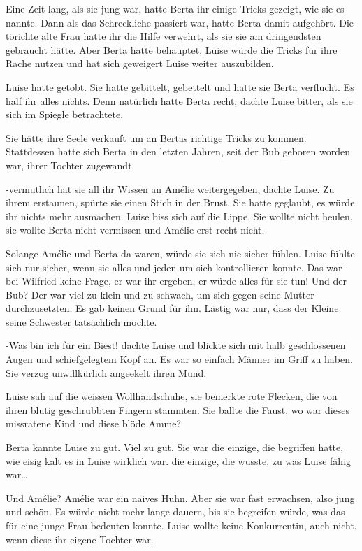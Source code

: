 \documentclass[11pt,titlepage,a5paper]{book}
\begin{document}
Eine Zeit lang, als sie jung war, hatte Berta ihr einige Tricks gezeigt, wie sie es nannte. Dann als das Schreckliche passiert war, hatte Berta damit aufgehört. Die törichte alte Frau hatte ihr die Hilfe verwehrt, als sie sie am dringendsten gebraucht hätte. Aber Berta hatte behauptet, Luise würde die Tricks für ihre Rache nutzen und hat sich geweigert Luise weiter auszubilden.

Luise hatte getobt. Sie hatte gebittelt, gebettelt und hatte sie Berta verflucht. Es half ihr alles nichts. Denn natürlich hatte Berta recht, dachte Luise bitter, als sie sich im Spiegle betrachtete.

Sie hätte ihre Seele verkauft um an Bertas richtige Tricks zu kommen. Stattdessen hatte sich Berta in den letzten Jahren, seit der Bub geboren worden war, ihrer Tochter zugewandt. 

-vermutlich hat sie all ihr Wissen an Amélie weitergegeben, dachte Luise. Zu ihrem erstaunen, spürte sie einen Stich in der Brust. Sie hatte geglaubt, es würde ihr nichts mehr ausmachen. Luise biss sich auf die Lippe. Sie wollte nicht heulen, sie wollte Berta nicht vermissen und Amélie erst recht nicht.

Solange Amélie und Berta da waren, würde sie sich nie sicher fühlen. Luise fühlte sich nur sicher, wenn sie alles und jeden um sich kontrollieren konnte. Das war bei Wilfried keine Frage, er war ihr ergeben, er würde alles für sie tun! Und der Bub? Der war viel zu klein und zu schwach, um sich gegen seine Mutter durchzusetzten. Es gab keinen Grund für ihn. Lästig war nur, dass der Kleine seine Schwester tatsächlich mochte.

-Was bin ich für ein Biest! dachte Luise und blickte sich mit halb geschlossenen Augen und schiefgelegtem Kopf an. Es war so einfach Männer im Griff zu haben. Sie verzog unwillkürlich angeekelt ihren Mund.

Luise sah auf die weissen Wollhandschuhe, sie bemerkte rote Flecken, die von ihren blutig geschrubbten Fingern stammten. Sie ballte die Faust, wo war dieses missratene Kind und diese blöde Amme?

Berta kannte Luise zu gut. Viel zu gut. Sie war die einzige, die begriffen hatte, wie eisig kalt es in Luise wirklich war. die einzige, die wusste, zu was Luise fähig war\dots

Und Amélie? Amélie war ein naives Huhn. Aber sie war fast erwachsen, also jung und schön. Es würde nicht mehr lange dauern, bis sie begreifen würde, was das für eine junge Frau bedeuten konnte. Luise wollte keine Konkurrentin, auch nicht, wenn diese ihr eigene Tochter war.
\end{document}
